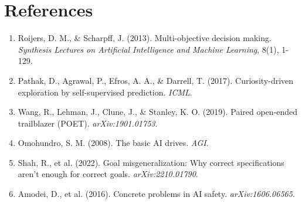 \documentclass[10pt,a4paper]{article}
\begin{document}
\section*{References}

\begin{enumerate}
\item Roijers, D. M., \& Scharpff, J. (2013). Multi-objective decision making. \textit{Synthesis Lectures on Artificial Intelligence and Machine Learning}, 8(1), 1-129.

\item Pathak, D., Agrawal, P., Efros, A. A., \& Darrell, T. (2017). Curiosity-driven exploration by self-supervised prediction. \textit{ICML}.

\item Wang, R., Lehman, J., Clune, J., \& Stanley, K. O. (2019). Paired open-ended trailblazer (POET). \textit{arXiv:1901.01753}.

\item Omohundro, S. M. (2008). The basic AI drives. \textit{AGI}.

\item Shah, R., et al. (2022). Goal misgeneralization: Why correct specifications aren't enough for correct goals. \textit{arXiv:2210.01790}.

\item Amodei, D., et al. (2016). Concrete problems in AI safety. \textit{arXiv:1606.06565}.
\end{enumerate}
\end{document}
